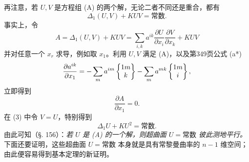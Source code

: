 再注意，若 $U,V$ 是方程组 (A) 的两个解，无论二者不同还是重合，都有
\[
\tag{3}
 \Delta_1(U,V)+KUV=\text{常数}.
\]
事实上，令
\[
 A=\Delta_1(U,V)+KUV=
 \sum_{i,k}a^{ik}\frac{\partial U}{\partial x_i}\frac{\partial V}{\partial x_k}+KUV
\]
并对任意一个 $x_r$ 求导，例如取 $x_1$。利用 $U,V$ 满足 (A)，以及第349页公式 (a*)
\[
 \frac{\partial a^{ik}}{\partial x_1}=-\sum_m a^{im}\left\{\begin{matrix}1m\\k\end{matrix}\right\}-\sum_m a^{mk}\left\{\begin{matrix}1m\\i\end{matrix}\right\},
\]
立即得到
\[
 \frac{\partial A}{\partial x_1}=0.
\]
在 (3) 中令 $V=U$，特别得到
\[
\tag{3*}
 \Delta_1 U+KU^2=\text{常数}.
\]
由此可知（§. 156）：\emph{若 $U$ 是 (A) 的一个解，则超曲面 $U=\text{常数}$ 彼此测地平行。}下面还要证明，这些超曲面 $U=\text{常数}$ 本身就是具有常黎曼曲率的 $n-1$ 维空间；由此便容易得到基本定理的新证明。
